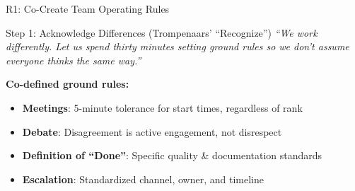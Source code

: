 \documentclass[aspectratio=169, 12pt]{beamer}
\newcommand{\presenter}[1]{\gdef\currentpresenter{#1}}
\gdef\currentpresenter{}
\begin{document}
\begin{frame}{R1: Co-Create Team Operating Rules}
\presenter{Presenter: Arihant JAIN}

\vspace{0.3em}

\begin{block}{Step 1: Acknowledge Differences (Trompenaars' ``Recognize'')}
\textit{``We work differently. Let us spend thirty minutes setting ground rules so we don't assume everyone thinks the same way.''}
\end{block}

\vspace{0.4em}

\textbf{Co-defined ground rules:}
\begin{itemize}
    \item \textbf{Meetings}: 5-minute tolerance for start times, regardless of rank
    \item \textbf{Debate}: Disagreement is active engagement, not disrespect
    \item \textbf{Definition of ``Done''}: Specific quality \& documentation standards
    \item \textbf{Escalation}: Standardized channel, owner, and timeline
\end{itemize}

\end{frame}

\end{document}
